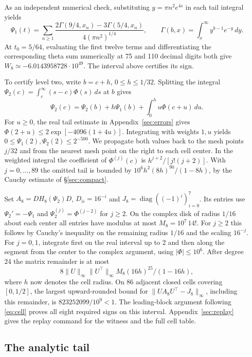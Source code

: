 \documentclass[11pt,a4paper,reqno]{amsart}
\numberwithin{equation}{section}
\begin{document}
As an independent numerical check, substituting \(y=\pi n^2 e^{4s}\) in each tail integral yields
\[
 \Psi_1(t)=\sum_{n\ge1}\frac{2\Gamma(9/4,x_n)-3\Gamma(5/4,x_n)}
 {4(\pi n^2)^{1/4}},\qquad \Gamma(b,x)=\int_x^\infty y^{b-1}e^{-y}\,dy .
\]
At \(t_0=5/64\), evaluating the first twelve terms and differentiating the corresponding theta sum numerically at 75 and 110 decimal digits both give \(W_8\simeq-6.0143958728\cdot10^{49}\). The interval above certifies its sign.

To certify level two, write \(b=c+h\), \(0\le h\le1/32\). Splitting the integral \(\Psi_2(c)=\int_c^\infty(s-c)\Phi(s)\,ds\) at \(b\) gives
\[
 \Psi_2(c)=\Psi_2(b)+h\Psi_1(b)+\int_0^h u\Phi(c+u)\,du .
\]
For \(u\ge0\), the real tail estimate in Appendix~\ref{sec:errors} gives \(\Phi(2+u)\le2\exp[-4096(1+4u)]\). Integrating with weights \(1,u\) yields \(0\le\Psi_1(2),\Psi_2(2)\le2^{-500}\). We propagate both values back to the mesh points \(j/32\) and from the nearest mesh point on the right to each cell center. In the weighted integral the coefficient of \(\Phi^{(j)}(c)\) is \(h^{j+2}/[j!(j+2)]\). With \(j=0,\ldots,89\) the omitted tail is bounded by \(10^6h^2(8h)^{90}/(1-8h)\), by the Cauchy estimate of \S\ref{sec:compact}.

Set \(A_8=DH_8(\Psi_2)D\), \(D_{ii}=16^{-i}\) and \(J_8=\operatorname{diag}((-1)^i)_{i=0}^7\). Its entries use \(\Psi_2'=-\Psi_1\) and \(\Psi_2^{(j)}=\Phi^{(j-2)}\) for \(j\ge2\). On the complex disk of radius \(1/16\) about each center all entries have modulus at most \(M_8=10^7\,14!\). For \(j\ge2\) this follows by Cauchy's inequality on the remaining radius \(1/16\) and the scaling \(16^{-j}\). For \(j=0,1\), integrate first on the real interval up to 2 and then along the segment from the center to the complex argument, using \(|\Phi|\le10^6\). After degree 24 the matrix remainder is at most
\[
 8\|U\|_\infty\|U^\top\|_\infty M_8(16h)^{25}/(1-16h),
\]
where \(h\) now denotes the cell radius. On 86 adjacent closed cells covering \([0,1/2]\), the largest upward-rounded bound for \(\|UA_8U^\top-J_8\|_\infty\), including this remainder, is \(823252099/10^9<1\). The leading-block argument following \eqref{eq:cell} proves all eight required signs on this interval. Appendix~\ref{sec:replay} gives the replay command for the witness and the full cell table.

\subsection{The analytic tail}\label{sec:tail}
\end{document}
